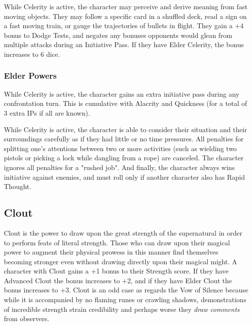  While Celerity is active, the character may perceive and derive meaning from fast moving objects. They may follow a specific card in a shuffled deck, read a sign on a fast moving train, or gauge the trajectories of bullets in flight. They gain a +4 bonus to Dodge Tests, and negates any bonuses opponents would glean from multiple attacks during an Initiative Pass. If they have Elder Celerity, the bonus increases to 6 dice.


\subsubsection{Elder Powers}

 While Celerity is active, the character gains an extra initiative pass during any confrontation turn. This is cumulative with Alacrity and Quickness (for a total of 3 extra IPs if all are known).

 While Celerity is active, the character is able to consider their situation and their surroundings carefully as if they had little or no time pressures. All penalties for splitting one's attentions between two or more activities (such as wielding two pistols or picking a lock while dangling from a rope) are canceled. The character ignores all penalties for a "rushed job". And finally, the character always wins initiative against enemies, and must roll only if another character also has Rapid Thought.


\subsection{Clout}

Clout is the power to draw upon the great strength of the supernatural in order to perform feats of literal strength. Those who can draw upon their magical power to augment their physical prowess in this manner find themselves becoming stronger even without drawing directly upon their magical might. A character with Clout gains a +1 bonus to their Strength score. If they have Advanced Clout the bonus increases to +2, and if they have Elder Clout the bonus increases to +3. Clout is an odd case as regards the Vow of Silence because while it is accompanied by no flaming runes or crawling shadows, demonstrations of incredible strength strain credibility and perhaps worse they \textit{draw comments} from observers.

